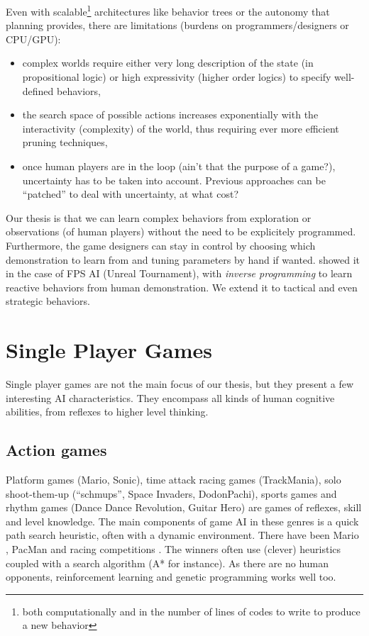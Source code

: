 Even with scalable\footnote{both computationally and in the number of lines of codes to write to produce a new behavior} architectures like behavior trees or the autonomy that planning provides, there are limitations (burdens on programmers/designers or CPU/GPU):
\begin{itemize}
    \item complex worlds require either very long description of the state (in propositional logic) or high expressivity (higher order logics) to specify well-defined behaviors,
    \item the search space of possible actions increases exponentially with the interactivity (complexity) of the world, thus requiring ever more efficient pruning techniques,
    \item once human players are in the loop (ain't that the purpose of a game?), uncertainty has to be taken into account. Previous approaches can be ``patched'' to deal with uncertainty, at what cost?
\end{itemize}
Our thesis is that we can learn complex behaviors from exploration or observations (of human players) without the need to be explicitely programmed. Furthermore, the game designers can stay in control by choosing which demonstration to learn from and tuning parameters by hand if wanted. \citet{lehy04} showed it in the case of FPS AI (Unreal Tournament), with \textit{inverse programming} to learn reactive behaviors from human demonstration. We extend it to tactical and even strategic behaviors.


\section{Single Player Games}

Single player games are not the main focus of our thesis, but they present a few interesting AI characteristics. They encompass all kinds of human cognitive abilities, from reflexes to higher level thinking.

\subsection{Action games}
Platform games (Mario, Sonic), time attack racing games (TrackMania), solo shoot-them-up (``schmups'', Space Invaders, DodonPachi), sports games and rhythm games (Dance Dance Revolution, Guitar Hero) are games of reflexes, skill and level knowledge. The main components of game AI in these genres is a quick path search heuristic, often with a dynamic environment. There have been Mario \citep{TogeliusMario10}, PacMan \citep{PacManCEC11} and racing competitions \citep{CarRacingWCCI08}. The winners often use (clever) heuristics coupled with a search algorithm (A* for instance). As there are no human opponents, reinforcement learning and genetic programming works well too.

